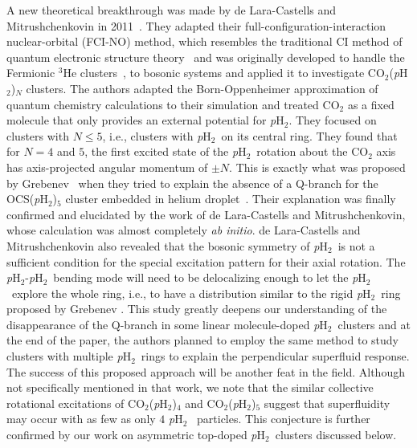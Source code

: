 \documentclass[12pt]{iopart}
\newcommand{\phtwo}{{\em p}H$_2$}
\begin{document}
A new theoretical breakthrough was made by de Lara-Castells and Mitrushchenkovin in 2011~\cite{ph2_ocs_ci}. 
They adapted their full-configuration-interaction nuclear-orbital (FCI-NO) method, 
which resembles the traditional CI method of quantum electronic structure theory~\cite{jungwirth_fcino} and was originally developed to handle the Fermionic $^3$He clusters~\cite{lara_fcino1,lara_fcino2,lara_fcino3,lara_fcino4,lara_fcino5}, to bosonic systems and applied it to investigate CO$_2$(\phtwo)$_N$ clusters. 
The authors adapted the Born-Oppenheimer approximation of quantum chemistry calculations to their simulation and treated CO$_2$ as a fixed molecule that only provides an external potential for \phtwo. 
They focused on  clusters with $N\le5$, i.e., clusters with \phtwo~on its central ring. 
They found that for $N=4$ and $5$, the first excited state of the \phtwo~rotation about the CO$_2$ axis has axis-projected angular momentum of $\pm N $. 
This is exactly what was proposed by Grebenev \etal~when they tried to explain the absence of a Q-branch for the OCS(\phtwo)$_5$ cluster embedded in helium droplet~\cite{grebenev_pH2_5ring}. 
Their explanation was finally confirmed and elucidated by the work of de Lara-Castells and Mitrushchenkovin, whose calculation was almost completely {\em ab initio}. de Lara-Castells and Mitrushchenkovin also revealed that the bosonic symmetry of \phtwo~is not a sufficient condition for the special excitation pattern for their axial rotation. 
The \phtwo-\phtwo~bending mode will need to be delocalizing enough to let the \phtwo ~explore the whole ring, i.e., to have a distribution similar to the rigid \phtwo~ring proposed by Grebenev \etal. 
This study greatly deepens our understanding of the disappearance of the Q-branch in some linear molecule-doped \phtwo~clusters and at the end of the paper, the authors planned to employ the same method to study clusters with multiple \phtwo~rings to explain the perpendicular superfluid response. 
The success of this proposed approach will be another feat in the field. 
Although not specifically mentioned in that work, we note that the similar collective rotational excitations of CO$_2$(\phtwo)$_4$ and CO$_2$(\phtwo)$_5$ suggest that  superfluidity may occur with as few as only $4$ \phtwo~ particles. 
This conjecture is further confirmed by our work on asymmetric top-doped \phtwo~clusters discussed below.
\end{document}

